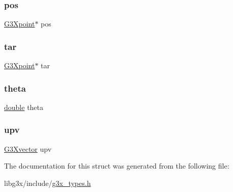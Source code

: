\mbox{\label{struct_g3_xcamera_a89b7ccb5e6816ed54f59a9617a904f87}} 
\subsubsection{\texorpdfstring{pos}{pos}}
{\footnotesize\ttfamily \hyperlink{g3x__types_8h_a656d1bc95bdef5a54decde84cfe9f60a}{G3\+Xpoint}$\ast$ pos}

\mbox{\label{struct_g3_xcamera_a9e81d1c93b5922975305fc19baee7b2e}} 
\subsubsection{\texorpdfstring{tar}{tar}}
{\footnotesize\ttfamily \hyperlink{g3x__types_8h_a656d1bc95bdef5a54decde84cfe9f60a}{G3\+Xpoint}$\ast$ tar}

\mbox{\label{struct_g3_xcamera_aca81c35c21e3a5f7f3a8d24504e76664}} 
\subsubsection{\texorpdfstring{theta}{theta}}
{\footnotesize\ttfamily \hyperlink{g3x__transfo_8h_a89b2b23e407882a535d835574a7912e1}{double} theta}

\mbox{\label{struct_g3_xcamera_adc4802615d8f0d628d8b2986f08bbce8}} 
\subsubsection{\texorpdfstring{upv}{upv}}
{\footnotesize\ttfamily \hyperlink{g3x__types_8h_a6181ad7c7bac1d7942ab3944bae2b8a1}{G3\+Xvector} upv}



The documentation for this struct was generated from the following file\+:\begin{DoxyCompactItemize}
\item 
libg3x/include/\hyperlink{g3x__types_8h}{g3x\+\_\+types.\+h}\end{DoxyCompactItemize}
